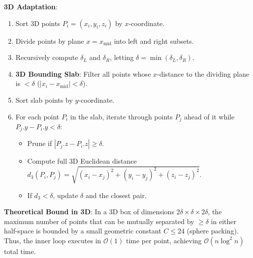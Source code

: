 \documentclass[12pt]{article}
\begin{document}
\textbf{3D Adaptation}:
\begin{enumerate}
    \item Sort 3D points $P_i = (x_i, y_i, z_i)$ by $x$-coordinate.
    \item Divide points by plane $x = x_{\text{mid}}$ into left and right subsets.
    \item Recursively compute $\delta_L$ and $\delta_R$, letting $\delta = \min(\delta_L, \delta_R)$.
    \item \textbf{3D Bounding Slab}: Filter all points whose $x$-distance to the dividing plane is $< \delta$ ($|x_i - x_{\text{mid}}| < \delta$).
    \item Sort slab points by $y$-coordinate.
    \item For each point $P_i$ in the slab, iterate through points $P_j$ ahead of it while $P_j.y - P_i.y < \delta$:
    \begin{itemize}
        \item Prune if $|P_j.z - P_i.z| \ge \delta$.
        \item Compute full 3D Euclidean distance $d_3(P_i, P_j) = \sqrt{(x_i-x_j)^2 + (y_i-y_j)^2 + (z_i-z_j)^2}$.
        \item If $d_3 < \delta$, update $\delta$ and the closest pair.
    \end{itemize}
\end{enumerate}

\textbf{Theoretical Bound in 3D}: In a 3D box of dimensions $2\delta \times \delta \times 2\delta$, the maximum number of points that can be mutually separated by $\ge \delta$ in either half-space is bounded by a small geometric constant $C \le 24$ (sphere packing). Thus, the inner loop executes in $\mathcal{O}(1)$ time per point, achieving $\mathcal{O}(n \log^2 n)$ total time.
\end{document}
